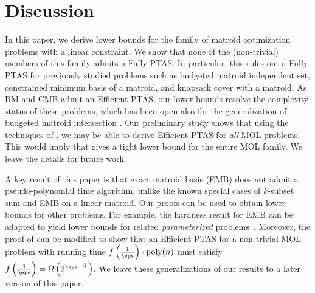 
\section{Discussion}
\label{sec:discussion}

In this paper, we derive lower bounds for the family of matroid optimization problems with a linear constraint. We show that none of the (non-trivial) members of this family 
admits a Fully PTAS. In particular, this rules out a Fully PTAS for previously studied problems such as {\sc budgeted matroid independent set}, 
{\sc constrained minimum basis of a matroid},
and {\sc knapsack cover with a matroid}. 
As BM and CMB admit an Efficient PTAS,
our lower bounds resolve the complexity status of these problems, which has been
open also for the generalization of {\sc budgeted matroid intersection} \cite{CVZ11,BBGS11,DKS23b}. Our preliminary study shows that using the techniques of \cite{HL04}, we may be able to derive Efficient PTAS for {\em all}  MOL problems. This would imply that  gives a tight lower bound for the entire MOL family.
We leave the details for future work.  

 A key result of this paper is that {\sc exact matroid basis} (EMB) does not admit a pseudo-polynomial time algorithm, unlike the known special cases of $k$-{\sc subset sum} and EMB on a linear matroid.
  Our proofs can be used to obtain lower bounds for other problems. For example, 
  the hardness result for EMB can be adapted to yield  
  lower bounds for related {\em parameterized} problems~\cite{FGKSS23,doron2023budgeted}.
  Moreover, the proof of  can be modified to show that an  Efficient PTAS for a non-trivial MOL problem with running time $f\left( \frac{1}{\eps}\right)\cdot \textnormal{poly}(n)$ must satisfy $f\left(\frac{1}{\eps} \right)=\Omega\left( 2^{\eps^{-\frac{1}{4}}}\right)$. We leave these generalizations of our results to a later version of this paper.   

